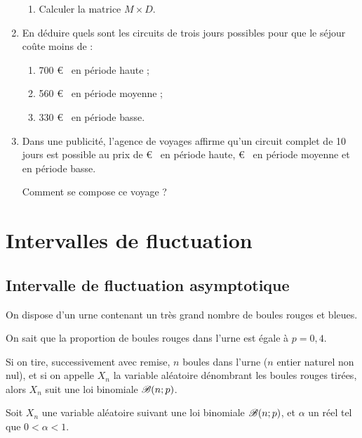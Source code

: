 \documentclass[12pt,french]{article}
\begin{document}
\begin{spacing}{1.2}
\begin{enumerate}
\begin{enumerate}
	\item Calculer la matrice $M\times D$.
	
	\end{enumerate}
\item En déduire quels sont les circuits de trois jours possibles pour que le séjour coûte moins de :
	\begin{enumerate}
	\item 700 \euro~ en période haute ;
	
	\item 560 \euro~ en période moyenne ;
	
	\item 330 \euro~ en période basse.
	
	\end{enumerate}

\item Dans une publicité, l'agence de voyages affirme qu'un circuit complet de 10 jours est possible au prix de  \euro~ en période haute,  \euro~ en période moyenne et  en période basse.

Comment se compose ce voyage ?

\end{enumerate}



\newpage
\section{Intervalles de fluctuation}

\subsection{Intervalle de fluctuation asymptotique}

On dispose d'un urne contenant un très grand nombre de boules rouges et bleues.

On sait que la proportion de boules rouges dans l'urne est égale à $p=0,4$.

Si on tire, successivement avec remise, $n$ boules dans l'urne ($n$ entier naturel non nul), et si on appelle $X_n$ la variable aléatoire dénombrant les boules rouges tirées, alors $X_n$ suit une loi binomiale $\mathscr{B}(n;p)$.

\medskip

\begin{theo}
Soit $X_n$ une variable aléatoire suivant une loi binomiale $\mathscr{B}(n;p)$, et $\alpha$ un réel tel que $0<\alpha<1$.


\end{theo}
\end{spacing}
\end{document}
